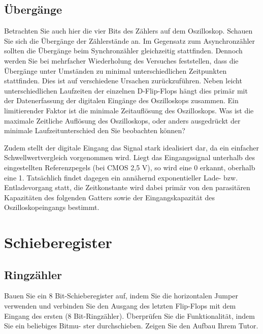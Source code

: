 \documentclass[10pt]{scrreprt}
\begin{document}
    \subsection{Übergänge}
    Betrachten Sie auch hier die vier Bits des Zählers auf dem Oszilloskop. Schauen Sie sich
    die Übergänge der Zählerstände an. Im Gegensatz zum Asynchronzähler sollten die
    Übergänge beim Synchronzähler gleichzeitig stattfinden. Dennoch werden Sie bei mehrfacher
    Wiederholung des Versuches feststellen, dass die Übergänge unter Umständen zu minimal
    unterschiedlichen Zeitpunkten stattfinden. Dies ist auf verschiedene Ursachen zurückzuführen.
    Neben leicht unterschiedlichen Laufzeiten der einzelnen D-Flip-Flops hängt dies
    primär mit der Datenerfassung der digitalen Eingänge des Oszilloskops zusammen. Ein
    limitierender Faktor ist die minimale Zeitauflösung des Oszilloskops. Was ist die maximale
    Zeitliche Auflösung des Oszilloskops, oder anders ausgedrückt der minimale Laufzeitunterschied
    den Sie beobachten können?

    \vspace{.5cm}

    Zudem stellt der digitale Eingang das Signal stark idealisiert dar, da ein einfacher
    Schwellwertvergleich vorgenommen wird. Liegt das Eingangssignal unterhalb des eingestellten
    Referenzpegels (bei CMOS 2,5 V), so wird eine 0 erkannt, oberhalb eine 1. Tatsächlich
    findet dagegen ein annähernd exponentieller Lade- bzw. Entladevorgang statt, die
    Zeitkonstante wird dabei primär von den parasitären Kapazitäten des folgenden Gatters sowie
    der Eingangskapazität des Oszilloskopeingangs bestimmt.

    \section{Schieberegister}
    \subsection{Ringzähler}
    Bauen Sie ein 8 Bit-Schieberegister auf, indem Sie die horizontalen Jumper verwenden
    und verbinden Sie den Ausgang des letzten Flip-Flops mit dem Eingang des ersten
    (8 Bit-Ringzähler). Überprüfen Sie die Funktionalität, indem Sie ein beliebiges Bitmu-
    ster \glqq{}durchschieben\grqq{}. Zeigen Sie den Aufbau Ihrem Tutor.
\end{document}
